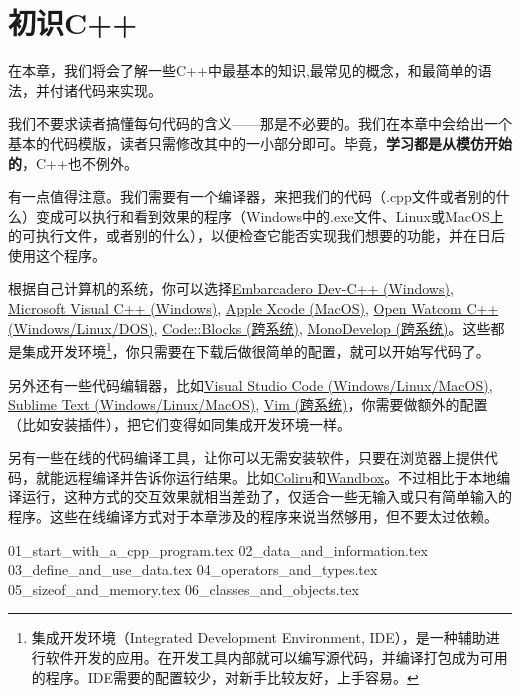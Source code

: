 \chapter{初识C++}
在本章，我们将会了解一些C++中最基本的知识,最常见的概念，和最简单的语法，并付诸代码来实现。\par
我们不要求读者搞懂每句代码的含义——那是不必要的。我们在本章中会给出一个基本的代码模版，读者只需修改其中的一小部分即可。毕竟，\textbf{学习都是从模仿开始的}，C++也不例外。\par
有一点值得注意。我们需要有一个编译器，来把我们的代码（.cpp文件或者别的什么）变成可以执行和看到效果的程序（Windows中的.exe文件、Linux或MacOS上的可执行文件，或者别的什么），以便检查它能否实现我们想要的功能，并在日后使用这个程序。\par
根据自己计算机的系统，你可以选择\href{https://www.embarcadero.com/free-tools/dev-cpp}{Embarcadero Dev-C++ (Windows)}, \href{https://learn.microsoft.com/zh-cn/cpp/?view=msvc-170}{Microsoft Visual C++ (Windows)}, \href{https://developer.apple.com/xcode/}{Apple Xcode (MacOS)}, \href{https://github.com/open-watcom/open-watcom-v2}{Open Watcom C++ (Windows/Linux/DOS)}, \href{https://www.codeblocks.org/}{Code::Blocks (跨系统)}, \href{https://www.monodevelop.com/}{MonoDevelop (跨系统)}。这些都是集成开发环境\footnote{集成开发环境（Integrated Development Environment, IDE），是一种辅助进行软件开发的应用。在开发工具内部就可以编写源代码，并编译打包成为可用的程序。IDE需要的配置较少，对新手比较友好，上手容易。}，你只需要在下载后做很简单的配置，就可以开始写代码了。\par
另外还有一些代码编辑器，比如\href{https://code.visualstudio.com/}{Visual Studio Code (Windows/Linux/MacOS)}, \href{https://www.sublimetext.com/}{Sublime Text (Windows/Linux/MacOS)}, \href{https://www.vim.org/}{Vim (跨系统)}，你需要做额外的配置（比如安装插件），把它们变得如同集成开发环境一样。\par
另有一些在线的代码编译工具，让你可以无需安装软件，只要在浏览器上提供代码，就能远程编译并告诉你运行结果。比如\href{https://coliru.stacked-crooked.com/}{Coliru}和\href{https://wandbox.org/}{Wandbox}。不过相比于本地编译运行，这种方式的交互效果就相当差劲了，仅适合一些无输入或只有简单输入的程序。这些在线编译方式对于本章涉及的程序来说当然够用，但不要太过依赖。\par
{01_start_with_a_cpp_program.tex}
{02_data_and_information.tex}
{03_define_and_use_data.tex}
{04_operators_and_types.tex}
{05_sizeof_and_memory.tex}
{06_classes_and_objects.tex}
